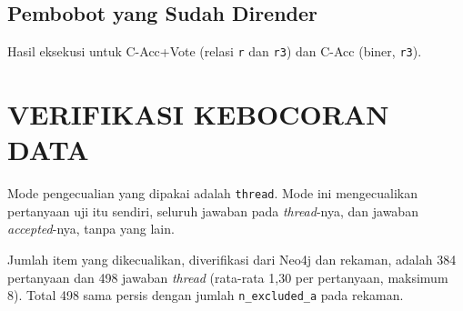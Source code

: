 





\section{Pembobot yang Sudah Dirender}
\label{sec:lamp-d-render}

Hasil eksekusi untuk C-Acc+Vote (relasi \texttt{r} dan \texttt{r3}) dan C-Acc (biner, \texttt{r3}).









\cleardoublepage
\chapter{VERIFIKASI KEBOCORAN DATA}
\label{lamp:kebocoran}

Mode pengecualian yang dipakai adalah \texttt{thread}. Mode ini mengecualikan pertanyaan uji itu sendiri, seluruh jawaban pada \emph{thread}-nya, dan jawaban \emph{accepted}-nya, tanpa yang lain.

Jumlah item yang dikecualikan, diverifikasi dari Neo4j dan rekaman, adalah 384 pertanyaan dan 498 jawaban \emph{thread} (rata-rata 1,30 per pertanyaan, maksimum 8). Total 498 sama persis dengan jumlah \texttt{n\_\allowbreak{}excluded\_\allowbreak{}a} pada rekaman.

